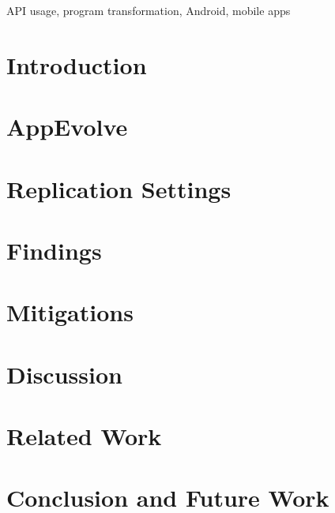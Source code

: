 \documentclass[conference]{IEEEtran}
\begin{document}
\begin{IEEEkeywords}
API usage, program transformation, Android, mobile apps
\end{IEEEkeywords}

\section{Introduction}


\section{AppEvolve}\label{sec:approach}


\section{Replication Settings}\label{sec:replication}


\section{Findings}\label{sec:findings}


\section{Mitigations}\label{sec:mitigations}


\section{Discussion}\label{sec:discuss}


\section{Related Work}\label{sec:related}


\section{Conclusion and Future Work}\label{sec:conclusion}



\balance



\end{document}
